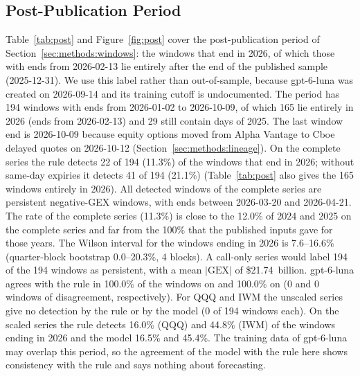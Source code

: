 \subsection{Post-Publication Period}
\label{sec:results:post}

Table~\ref{tab:post} and Figure~\ref{fig:post} cover the post-publication period of Section~\ref{sec:methods:windows}: the windows that end in 2026, of which those with ends from 2026-02-13 lie entirely after the end of the published sample (2025-12-31). We use this label rather than out-of-sample, because gpt-6-luna was created on 2026-09-14 and its training cutoff is undocumented.
The period has 194 windows with ends from 2026-01-02 to 2026-10-09, of which 165 lie entirely in 2026 (ends from 2026-02-13) and 29 still contain days of 2025. The last window end is 2026-10-09 because equity options moved from Alpha Vantage to Cboe delayed quotes on 2026-10-12 (Section~\ref{sec:methods:lineage}). On the complete series the rule detects 22 of 194 (11.3\%) of the windows that end in 2026; without same-day expiries it detects 41 of 194 (21.1\%) (Table~\ref{tab:post} also gives the 165 windows entirely in 2026). All detected windows of the complete series are persistent negative-GEX windows, with ends between 2026-03-20 and 2026-04-21. The rate of the complete series (11.3\%) is close to the 12.0\% of 2024 and 2025 on the complete series and far from the 100\% that the published inputs gave for those years. The Wilson interval for the windows ending in 2026 is 7.6--16.6\% (quarter-block bootstrap 0.0--20.3\%, 4 blocks). A call-only series would label 194 of the 194 windows as persistent, with a mean $|\mathrm{GEX}|$ of \$21.74~billion. gpt-6-luna agrees with the rule in 100.0\% of the windows on  and 100.0\% on  (0 and 0 windows of disagreement, respectively). For QQQ and IWM the unscaled series give no detection by the rule or by the model (0 of 194 windows each). On the scaled series the rule detects 16.0\% (QQQ) and 44.8\% (IWM) of the windows ending in 2026 and the model 16.5\% and 45.4\%. The training data of gpt-6-luna may overlap this period, so the agreement of the model with the rule here shows consistency with the rule and says nothing about forecasting.

